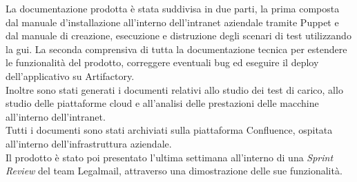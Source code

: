 La documentazione prodotta è stata suddivisa in due parti, la prima composta dal manuale d'installazione all'interno dell'\gls{intranet} aziendale tramite Puppet e dal manuale di creazione, esecuzione e distruzione degli scenari di test utilizzando la \gls{gui}. La seconda comprensiva di tutta la documentazione tecnica per estendere le funzionalità del prodotto, correggere eventuali bug ed eseguire il \gls{deploy} dell'applicativo su Artifactory.\\
Inoltre sono stati generati i documenti relativi allo studio dei test di carico, allo studio delle piattaforme cloud e all'analisi delle prestazioni delle macchine all'interno dell'\gls{intranet}.\\
Tutti i documenti sono stati archiviati sulla piattaforma Confluence, ospitata all'interno dell'infrastruttura aziendale.\\
Il prodotto è stato poi presentato l'ultima settimana all'interno di una \textit{Sprint Review} del team Legalmail, attraverso una dimostrazione delle sue funzionalità.